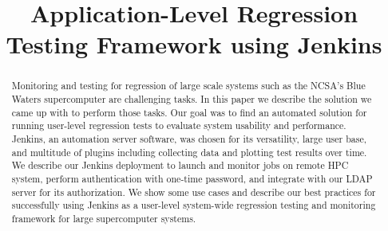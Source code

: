 \documentclass[10pt, conference, compsocconf]{IEEEtran}
\begin{document}
\title{Application-Level Regression Testing Framework using Jenkins}




%

\author{

\and


}

\maketitle
\thispagestyle{plain}

\begin{abstract}
Monitoring and testing for regression of large scale systems such as the NCSA's Blue Waters supercomputer are challenging tasks. 
In this paper we describe the solution we came up with to perform those tasks. 
Our goal was to find an automated solution for running user-level regression tests to evaluate system usability and performance.
Jenkins, an automation server software, was chosen for its versatility, large user base, and multitude of plugins including collecting data and plotting test results over time. 
We describe our Jenkins deployment to launch and monitor jobs on remote HPC system, perform authentication with one-time password, and integrate with our LDAP server for its authorization. 
We show some use cases and describe our best practices for successfully using Jenkins as a user-level system-wide regression testing and monitoring framework for large supercomputer systems.

\end{abstract}
\end{document}

